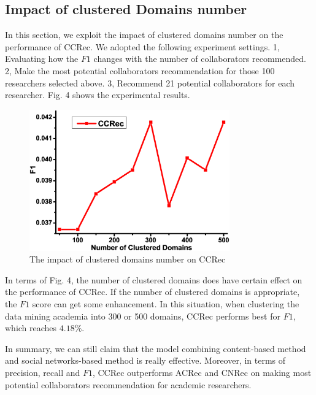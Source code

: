 \documentclass{acm_proc_article-sp}
\begin{document}
\subsection{Impact of clustered Domains number}
In this section, we exploit the impact of clustered domains number on the performance of CCRec. We adopted the following experiment settings. 1, Evaluating how the $F1$ changes with the number of collaborators recommended. 2, Make the most potential collaborators recommendation for those 100 researchers selected above. 3, Recommend 21 potential collaborators for each researcher. Fig. 4 shows the experimental results.

\begin{figure}
\centering
\includegraphics [width=3.4in]{Fig4.eps}
\caption{The impact of clustered domains number on CCRec}
\end{figure}

In terms of Fig. 4, the number of clustered domains does have certain effect on the performance of CCRec. If the number of clustered domains is appropriate, the $F1$ score can get some enhancement. In this situation, when clustering the data mining academia into 300 or 500 domains, CCRec performs best for $F1$, which reaches $4.18\%$.

In summary, we can still claim that the model combining content-based method and social networks-based method is really effective. Moreover, in terms of precision, recall and $F1$, CCRec outperforms ACRec and CNRec on making most potential collaborators recommendation for academic researchers.
\end{document}
